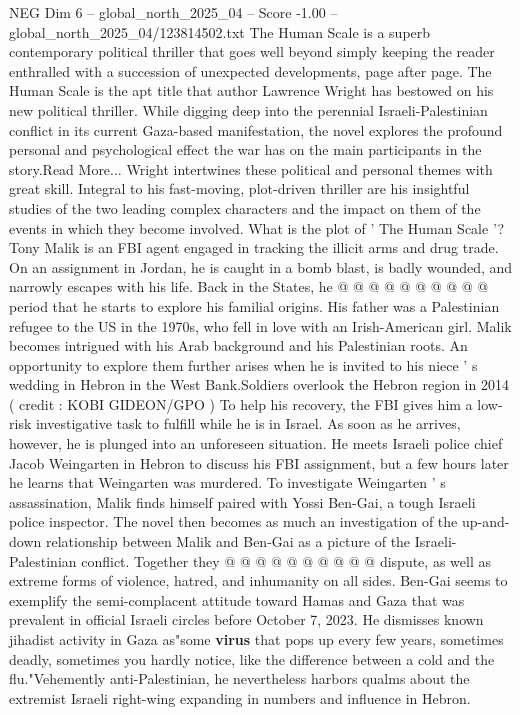 \begin{textsample}{NEG Dim 6 – global\_north\_2025\_04 – Score -1.00 – global\_north\_2025\_04/123814502.txt}  \label{ex:f6_neg_266}
The Human Scale is a superb contemporary political thriller that goes well beyond simply keeping the reader enthralled with a succession of unexpected developments, page after page.
The Human Scale is the apt title that author Lawrence Wright has bestowed on his new political thriller.
While digging deep into the perennial Israeli-Palestinian conflict in its current Gaza-based manifestation, the novel explores the profound personal and psychological effect the war has on the main participants in the story.Read More...
Wright intertwines these political and personal themes with great skill.
Integral to his fast-moving, plot-driven thriller are his insightful studies of the two leading complex characters and the impact on them of the events in which they become involved.
What is the plot of ' The Human Scale '?
Tony Malik is an FBI agent engaged in tracking the illicit arms and drug trade.
On an assignment in Jordan, he is caught in a bomb blast, is badly wounded, and narrowly escapes with his life.
Back in the States, he @ @ @ @ @ @ @ @ @ @ period that he starts to explore his familial origins.
His father was a Palestinian refugee to the US in the 1970s, who fell in love with an Irish-American girl.
Malik becomes intrigued with his Arab background and his Palestinian roots.
An opportunity to explore them further arises when he is invited to his niece ' s wedding in Hebron in the West Bank.Soldiers overlook the Hebron region in 2014 ( credit : KOBI GIDEON/GPO ) To help his recovery, the FBI gives him a low-risk investigative task to fulfill while he is in Israel.
As soon as he arrives, however, he is plunged into an unforeseen situation.
He meets Israeli police chief Jacob Weingarten in Hebron to discuss his FBI assignment, but a few hours later he learns that Weingarten was murdered.
To investigate Weingarten ' s assassination, Malik finds himself paired with Yossi Ben-Gai, a tough Israeli police inspector.
The novel then becomes as much an investigation of the up-and-down relationship between Malik and Ben-Gai as a picture of the Israeli-Palestinian conflict.
Together they @ @ @ @ @ @ @ @ @ @ dispute, as well as extreme forms of violence, hatred, and inhumanity on all sides.
Ben-Gai seems to exemplify the semi-complacent attitude toward Hamas and Gaza that was prevalent in official Israeli circles before October 7, 2023.
He dismisses known jihadist activity in Gaza as"some \textbf{virus} that pops up every few years, sometimes deadly, sometimes you hardly notice, like the difference between a cold and the flu."Vehemently anti-Palestinian, he nevertheless harbors qualms about the extremist Israeli right-wing expanding in numbers and influence in Hebron.

\end{textsample}

